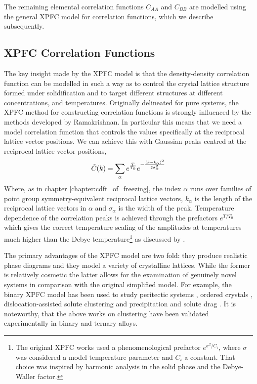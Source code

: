 The remaining elemental correlation functions $C_{AA}$ and $C_{BB}$ are modelled
using the general XPFC model for correlation functions, which we describe
subsequently.

\subsection{XPFC Correlation Functions} %

The key insight made by the XPFC model is that the density-density
correlation function can be modelled in such a way as to control the crystal
lattice structure formed under solidification and to target different structures at
different concentrations, and temperatures. Originally delineated for pure
systems, the XPFC method for constructing correlation functions is strongly
influenced by the methods developed by Ramakrishnan. In particular this means
that we need a model correlation function that controls the values specifically
at the reciprocal lattice vector positions. We can achieve this with Gaussian
peaks centred at the reciprocal lattice vector positions,
%
\begin{equation}
    \tilde{C}(k) = \sum_{\alpha} e^{\frac{T}{T_0}}
        e^{ - \frac{(k - k_\alpha)^2}{2\sigma_\alpha^2}}
        \label{XPFC_C2}
\end{equation}
%
Where, as in chapter \ref{chapter:cdft_of_freezing}, the index $\alpha$ runs
over families of point group symmetry-equivalent reciprocal lattice vectors,
$k_\alpha$ is the length of the reciprocal lattice vectors in $\alpha$ and
$\sigma_\alpha$ is the width of the peak. Temperature dependence of the
correlation peaks is achieved through the prefactors $e^{T / T_0}$ which gives
the correct temperature scaling of the amplitudes at temperatures much higher
than the Debye temperature\footnote{The original XPFC works used a
phenomenological prefactor $e^{\sigma^2 / C_i}$, where $\sigma$ was considered
a model temperature parameter and $C_i$ a constant. That choice was inspired by
harmonic analysis in the solid phase and the Debye-Waller factor.} as discussed
by \cite{ALSTER17}.

The primary advantages of the XPFC model are two fold: they produce realistic
phase diagrams and they model a variety of crystalline lattices. While the
former is relatively cosmetic the latter allows for the examination of
genuinely novel systems in comparison with the original simplified model. For
example, the binary XPFC model has been used to study peritectic systems
\cite{GREENWOOD11_BINARY}, ordered crystals \cite{ALSTER17},
dislocation-assisted solute clustering and precipitation \cite{FALLAH12,
FALLAH13} and solute drag \cite{GREENWOOD12}. It is noteworthy, that the above
works on clustering have been validated experimentally in binary and ternary
alloys.

